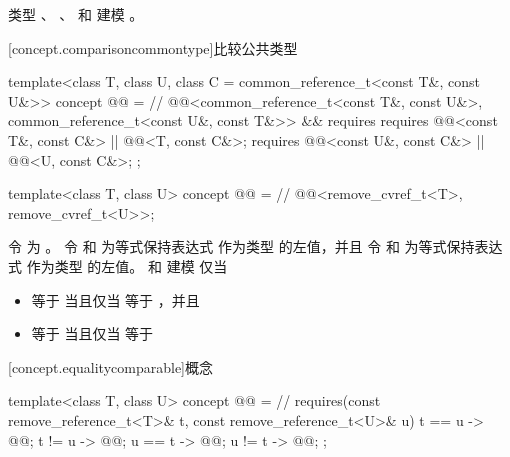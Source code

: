 \pnum
\begin{example}
类型
、
、
 和
建模 。
\end{example}

[concept.comparisoncommontype]{比较公共类型}

\begin{itemdecl}
template<class T, class U, class C = common_reference_t<const T&, const U&>>
concept @@ =   // \expos
  @@<common_reference_t<const T&, const U&>,
          common_reference_t<const U&, const T&>> &&
  requires {
    requires @@<const T&, const C&> || @@<T, const C&>;
    requires @@<const U&, const C&> || @@<U, const C&>;
  };

template<class T, class U>
concept @@ =   // \expos
  @@<remove_cvref_t<T>, remove_cvref_t<U>>;
\end{itemdecl}

\pnum
令  为 。
令  和  为等式保持表达式
作为类型  的左值，并且
令  和  为等式保持表达式
作为类型  的左值。
 和  建模
 仅当
\begin{itemize}
\item
{} 等于
当且仅当  等于 ，并且
\item
{} 等于
当且仅当  等于 
\end{itemize}

[concept.equalitycomparable]{概念 }

\begin{itemdecl}
template<class T, class U>
  concept @@ = // \expos
    requires(const remove_reference_t<T>& t,
             const remove_reference_t<U>& u) {
      { t == u } -> @@;
      { t != u } -> @@;
      { u == t } -> @@;
      { u != t } -> @@;
    };
\end{itemdecl}

